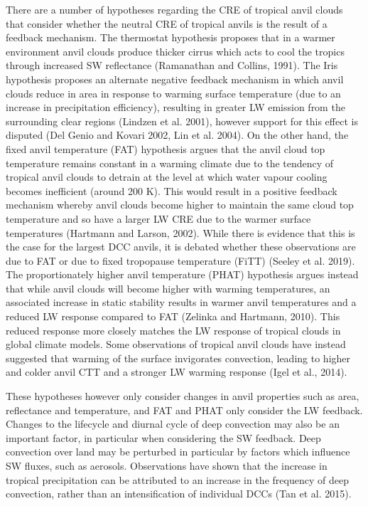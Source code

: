 There are a number of hypotheses regarding the CRE of tropical anvil
clouds that consider whether the neutral CRE of tropical anvils is the
result of a feedback mechanism. The thermostat hypothesis proposes that
in a warmer environment anvil clouds produce thicker cirrus which acts
to cool the tropics through increased SW reflectance (Ramanathan and
Collins, 1991). The Iris hypothesis proposes an alternate negative
feedback mechanism in which anvil clouds reduce in area in response to
warming surface temperature (due to an increase in precipitation
efficiency), resulting in greater LW emission from the surrounding clear
regions (Lindzen et al. 2001), however support for this effect is
disputed (Del Genio and Kovari 2002, Lin et al. 2004). On the other
hand, the fixed anvil temperature (FAT) hypothesis argues that the anvil
cloud top temperature remains constant in a warming climate due to the
tendency of tropical anvil clouds to detrain at the level at which water
vapour cooling becomes inefficient (around 200 K). This would result in
a positive feedback mechanism whereby anvil clouds become higher to
maintain the same cloud top temperature and so have a larger LW CRE due
to the warmer surface temperatures (Hartmann and Larson, 2002). While
there is evidence that this is the case for the largest DCC anvils, it
is debated whether these observations are due to FAT or due to fixed
tropopause temperature (FiTT) (Seeley et al. 2019). The proportionately
higher anvil temperature (PHAT) hypothesis argues instead that while
anvil clouds will become higher with warming temperatures, an associated
increase in static stability results in warmer anvil temperatures and a
reduced LW response compared to FAT (Zelinka and Hartmann, 2010). This
reduced response more closely matches the LW response of tropical clouds
in global climate models. Some observations of tropical anvil clouds
have instead suggested that warming of the surface invigorates
convection, leading to higher and colder anvil CTT and a stronger LW
warming response (Igel et al., 2014).

These hypotheses however only consider changes in anvil properties such
as area, reflectance and temperature, and FAT and PHAT only consider the
LW feedback. Changes to the lifecycle and diurnal cycle of deep
convection may also be an important factor, in particular when
considering the SW feedback. Deep convection over land may be perturbed
in particular by factors which influence SW fluxes, such as aerosols.
Observations have shown that the increase in tropical precipitation can
be attributed to an increase in the frequency of deep convection, rather
than an intensification of individual DCCs (Tan et al. 2015).


